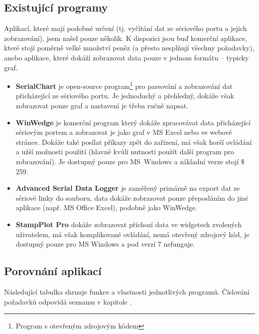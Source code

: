 \documentclass[12pt, a4paper, oneside]{article}
\begin{document}
\subsection{Existující programy}
Aplikací, které mají podobné určení (tj. vyčítání dat ze sériového portu a jejich zobrazování), jsem našel pouze několik. K dispozici jsou buď komerční aplikace, které stojí poměrně velké množství peněz (a přesto nesplňují všechny požadavky), anebo aplikace, které dokáží zobrazovat data pouze v jednom formátu -- typicky graf.

\begin{itemize}
    \item {\bf SerialChart}\cite{serialchart} je open-source program\footnote{Program s otevřeným zdrojovým kódem} pro parsování a zobrazování dat přicházející ze sériového portu. Je jednoduchý a přehledný, dokáže však zobrazovat pouze graf a nastavení je třeba ručně napsat.
    \item {\bf WinWedge}\cite{winwedge} je komerční program který dokáže zpracovávat data přicházející sériovým portem a zobrazovat je jako graf v MS Excel nebo ve webové stránce. Dokáže také posílat příkazy zpět do zařízení, má však horší ovládání a užší možnosti použití (hlavně kvůli nutnosti použít další program pro zobrazování). Je dostupný pouze pro MS~Windows a základní verze stojí \$ 259.
    \item {\bf Advanced Serial Data Logger}\cite{serialdatalogger} je zaměřený primárně na export dat ze sériové linky do souboru, data dokáže zobrazovat pouze přeposláním do jiné aplikace (např. MS Office Excel), podobně jako WinWedge.
    \item {\bf StampPlot Pro}\cite{stamplot} dokáže zobrazovat příchozí data ve widgetech zvolených uživatelem, má však komplikované ovládání, nemá otevřený zdrojový kód, je dostupný pouze pro MS Windows a pod verzí 7 nefunguje.
\end{itemize}


\subsection{Porovnání aplikací}
Následující tabulka shrnuje funkce a vlastnosti jednotlivých programů. Číslování požadavků odpovídá seznamu v kapitole .

\vspace{5mm}
\end{document}
